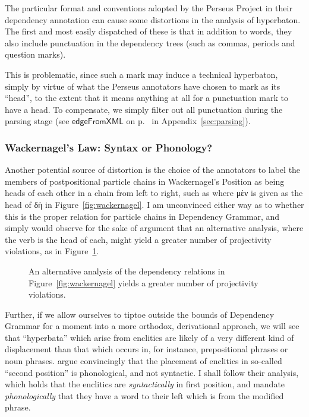 \documentclass[letterpaper, 11pt]{article}
\newcommand{\FN}{\mathsf}
\newcommand{\salt}[1]{{\addfontfeature{Style=Alternate}{#1}}}
\def\gkbarnode#1{\xybarnode{\textgreek{#1}}}
\begin{document}
The particular format and conventions adopted by the Perseus Project in their
dependency annotation can cause some distortions in the analysis of hyperbaton.
The first and most easily dispatched of these is that in addition to words, they
also include punctuation in the dependency trees (such as commas, periods and
question marks).

This is problematic, since such a mark may induce a technical hyperbaton, simply
by virtue of what the Perseus annotators have chosen to mark as its ``head'', to
the extent that it means anything at all for a punctuation mark to have a head.
To compensate, we simply filter out all punctuation during the parsing stage
(see \ensuremath{\FN{edgeFromXML}} on p.\ \pageref{func:edge-from-xml} in
Appendix~\ref{sec:parsing}).

\subsubsection*{Wackernagel's Law: Syntax or Phonology?}

Another potential source of distortion is the choice of the annotators to label
the members of postpositional particle chains in Wackernagel's Position as being
heads of each other in a chain from left to right, such as where \textgreek{μὲν}
is given as the head of \textgreek{δὴ} in Figure~\ref{fig:wackernagel}. I am
unconvinced either way as to whether this is the proper relation for particle
chains in Dependency Grammar, and simply would observe for the sake of argument
that an alternative analysis, where the verb is the head of each, might yield a
greater number of projectivity violations, as in
Figure~\ref{fig:wackernagel-redux}.

\begin{figure}[h!]
\centering
\xytext{
    \gkbarnode{τὰ}\xybarconnect[6]{3}&
    \gkbarnode{μὲν}&
    \gkbarnode{δὴ}&
    \gkbarnode{πόλεος}&
    \gkbarnode{...}&
    \gkbarnode{ὤρ\salt{θ}ησαν}
      \xybarconnect[9](U,UL){-5}
      \xybarconnect[9]{-4}
      \xybarconnect[9]{-3}
}
\caption{An alternative analysis of the dependency relations in
Figure~\ref{fig:wackernagel} yields a greater number of projectivity violations.}
\label{fig:wackernagel-redux}
\end{figure}

Further, if we allow ourselves to tiptoe outside the bounds of Dependency Grammar
for a moment into a more orthodox, derivational approach, we will see that
``hyperbata'' which arise from enclitics are likely of a very different kind of
displacement than that which occurs in, for instance, prepositional phrases or
noun phrases.  \citet{agbayani2010second} argue convincingly that the placement
of enclitics in so-called ``second position'' is phonological, and not
syntactic. I shall follow their analysis, which holds that the enclitics are
\emph{syntactically} in first position, and mandate \emph{phonologically} that
they have a word to their left which is from the modified phrase.
\end{document}

